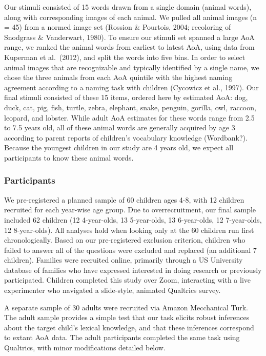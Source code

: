 \documentclass[10pt, letterpaper]{article}
\begin{document}
Our stimuli consisted of 15 words drawn from a single domain (animal
words), along with corresponding images of each animal. We pulled all
animal images (n = 45) from a normed image set (Rossion \& Pourtois,
2004; recoloring of Snodgrass \& Vanderwart, 1980). To ensure our
stimuli set spanned a large AoA range, we ranked the animal words from
earliest to latest AoA, using data from Kuperman et al.~(2012), and
split the words into five bins. In order to select animal images that
are recognizable and typically identified by a single name, we chose the
three animals from each AoA quintile with the highest naming agreement
according to a naming task with children (Cycowicz et al., 1997). Our
final stimuli consisted of these 15 items, ordered here by estimated
AoA: dog, duck, cat, pig, fish, turtle, zebra, elephant, snake, penguin,
gorilla, owl, raccoon, leopard, and lobster. While adult AoA estimates
for these words range from 2.5 to 7.5 years old, all of these animal
words are generally acquired by age 3 according to parent reports of
children's vocabulary knowledge (Wordbank?). Because the youngest
children in our study are 4 years old, we expect all participants to
know these animal words.

\hypertarget{participants}{%
\subsubsection{Participants}\label{participants}}

We pre-registered a planned sample of 60 children ages 4-8, with 12
children recruited for each year-wise age group. Due to overrecruitment,
our final sample included 62 children (12 4-year-olds, 13 5-year-olds,
13 6-year-olds, 12 7-year-olds, 12 8-year-olds). All analyses hold when
looking only at the 60 children run first chronologically. Based on our
pre-registered exclusion criterion, children who failed to answer all of
the questions were excluded and replaced (an additional 7 children).
Families were recruited online, primarily through a US University
database of families who have expressed interested in doing research or
previously participated. Children completed this study over Zoom,
interacting with a live experimenter who navigated a slide-style,
animated Qualtrics survey.

A separate sample of 30 adults were recruited via Amazon Mecchanical
Turk. The adult sample provides a simple test that our task elicits
robust inferences about the target child's lexical knowledge, and that
these inferences correspond to extant AoA data. The adult participants
completed the same task using Qualtrics, with minor modifications
detailed below.
\end{document}
